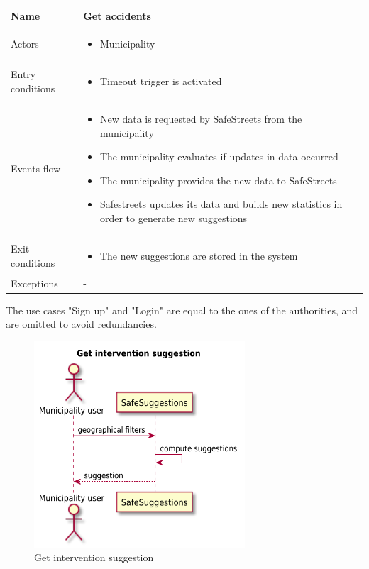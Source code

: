 \documentclass[a4paper]{article}
\begin{document}
\begin{table}[H]
\centering
\begin{tabularx}{\textwidth}{|l|X|}
\hline
Name & Get accidents\tabularnewline
\hline
Actors &
\begin{itemize}[nosep,leftmargin=*]
\item Municipality
\end{itemize}
\tabularnewline
\hline
Entry conditions &
\begin{itemize}[nosep,leftmargin=*]
\item Timeout trigger is activated
\end{itemize}
\tabularnewline
\hline
Events flow &
\begin{itemize}[nosep,leftmargin=*]
\item New data is requested by SafeStreets from the municipality
\item The municipality evaluates if updates in data occurred
\item The municipality provides the new data to SafeStreets
\item Safestreets updates its data and builds new statistics in order to
generate new suggestions
\end{itemize}
\tabularnewline
\hline
Exit conditions &
\begin{itemize}[nosep,leftmargin=*]
\item The new suggestions are stored in the system
\end{itemize}
\tabularnewline
\hline
Exceptions & -\tabularnewline
\hline
\end{tabularx}
\end{table}

The use cases "Sign up" and "Login" are equal to the ones of the
authorities, and are omitted to avoid redundancies.

\begin{figure}[H]
\centering
\includegraphics[width=0.7\textwidth]{get_intervention_suggestion_sequence_diagram}
\caption{Get intervention suggestion}
\end{figure}
\end{document}
